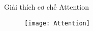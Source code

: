 \begin{frame}{Giải thích cơ chế Attention}
	\begin{figure}
		\centering
		\texttt{[image: Attention]}
	\end{figure}
\end{frame}







%	
%	
%	
%	

